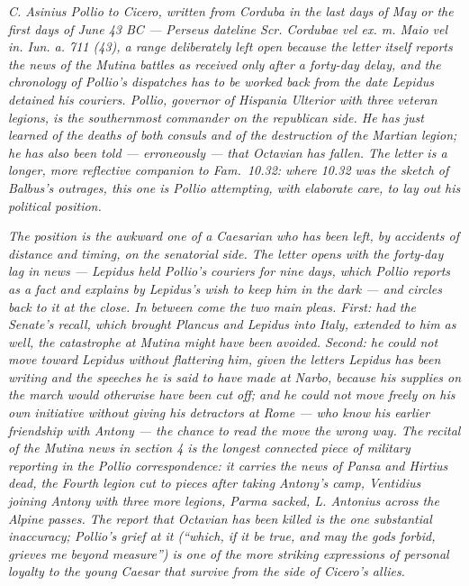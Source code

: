 
\textit{C. Asinius Pollio to Cicero, written from Corduba
in the last days of May or the first days of June 43 BC
--- Perseus dateline \textit{Scr. Cordubae vel ex. m.
Maio vel in. Iun. a. 711 (43)}, a range deliberately left
open because the letter itself reports the news of the
Mutina battles as received only after a forty-day delay,
and the chronology of Pollio's dispatches has to be
worked back from the date Lepidus detained his couriers.
Pollio, governor of Hispania Ulterior with three veteran
legions, is the southernmost commander on the
republican side. He has just learned of the deaths of
both consuls and of the destruction of the Martian
legion; he has also been told --- erroneously --- that
Octavian has fallen. The letter is a longer, more
reflective companion to Fam.~10.32: where 10.32 was the
sketch of Balbus's outrages, this one is Pollio
attempting, with elaborate care, to lay out his
political position.}

\textit{The position is the awkward one of a Caesarian
who has been left, by accidents of distance and timing,
on the senatorial side. The letter opens with the
forty-day lag in news --- Lepidus held Pollio's
couriers for nine days, which Pollio reports as a fact
and explains by Lepidus's wish to keep him in the dark
--- and circles back to it at the close. In between
come the two main pleas. First: had the Senate's
recall, which brought Plancus and Lepidus into Italy,
extended to him as well, the catastrophe at Mutina
might have been avoided. Second: he could not move
toward Lepidus without flattering him, given the
letters Lepidus has been writing and the speeches he is
said to have made at Narbo, because his supplies on the
march would otherwise have been cut off; and he could
not move freely on his own initiative without giving
his detractors at Rome --- who know his earlier
friendship with Antony --- the chance to read the move
the wrong way. The recital of the Mutina news in
section 4 is the longest connected piece of military
reporting in the Pollio correspondence: it carries the
news of Pansa and Hirtius dead, the Fourth legion cut
to pieces after taking Antony's camp, Ventidius
joining Antony with three more legions, Parma
sacked, L. Antonius across the Alpine passes. The
report that Octavian has been killed is the one
substantial inaccuracy; Pollio's grief at it (``which,
if it be true, and may the gods forbid, grieves me
beyond measure'') is one of the more striking
expressions of personal loyalty to the young Caesar
that survive from the side of Cicero's allies.}

